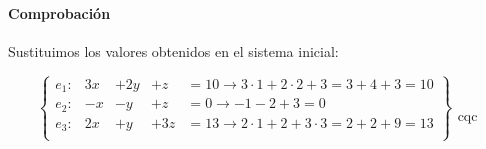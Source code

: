 \documentclass[palatino,nosec,nochap]{Docencia}
\begin{document}
\begin{problem}
\paragraph{Comprobación}

Sustituimos los valores obtenidos en el sistema inicial:


\[
\left\{\begin{array}{lcccl}
e_1: & 3x &+ 2y &+z &=10 \to 3·1+2·2+3 = 3+4+3 = 10  \\
e_2: & -x&-y&+z&=0 \to -1-2+3 = 0  \\
e_3: & 2x&+y&+3z&=13 \to 2·1+2+3·3 = 2+2+9 = 13  \\
\end{array}\right\} \begin{array}{c}\\\\\\\\\text{cqc}\end{array}
\]
\end{problem}
\end{document}
